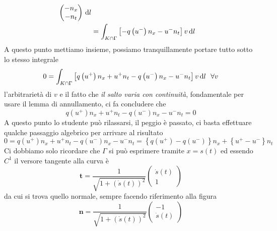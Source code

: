 \begin{dimostrazione}
\begin{align*}
\begin{pmatrix}
            -n_{x} \\
            -n_{t}
        \end{pmatrix} \,\mathrm d l                                                                                                                                                              \\
                                                        & =\int _{K\cap \Gamma }\left[ -q\left(u^{-}\right) n_{x} -u^{-} n_{t}\right] v\,\mathrm d l
    \end{align*}
    A questo punto mettiamo insieme, possiamo tranquillamente portare tutto sotto lo stesso integrale
    \begin{equation*}
        0=\int _{K\cap \Gamma }\left[ q\left(u^{+}\right) n_{x} +u^{+} n_{t} -q\left(u^{-}\right) n_{x} -u^{-} n_{t}\right] v\dl\ \ \forall v
    \end{equation*}
    l'arbitrarietà di $v$ e il fatto che \emph{il salto varia con continuità}, fondamentale per usare il lemma di annullamento, ci fa concludere che
    \begin{equation*}
        q\left(u^{+}\right) n_{x} +u^{+} n_{t} -q\left(u^{-}\right) n_{x} -u^{-} n_{t} =0
    \end{equation*}
    A questo punto lo studente può rilassarsi, il peggio è passato, ci basta effettuare qualche passaggio algebrico per arrivare al risultato
    \begin{equation*}
        0=q\left(u^{+}\right) n_{x} +u^{+} n_{t} -q\left(u^{-}\right) n_{x} -u^{-} n_{t} =\left\{q\left(u^{+}\right) -q\left(u^{-}\right)\right\} n_{x} +\left\{u^{+} -u^{-}\right\} n_{t}
    \end{equation*}
    Ci dobbiamo solo ricordare che $\Gamma $ si può esprimere tramite $x=s(t)$ ed essendo $C^{1}$ il versore tangente alla curva è
    \begin{equation*}
        \mathbf{t} =\frac{1}{\sqrt{1+(\dot{s}(t))^{2}}}
        \begin{pmatrix}
            \dot{s}(t) \\
            1
        \end{pmatrix}
    \end{equation*}
    da cui si trova quello normale, sempre facendo riferimento alla figura
    \begin{equation*}
        \mathbf{n} =\frac{1}{\sqrt{1+(\dot{s}(t))^{2}}}
        \begin{pmatrix}
            -1 \\
            \dot{s}(t)
        \end{pmatrix}

\end{equation*}
\end{dimostrazione}
